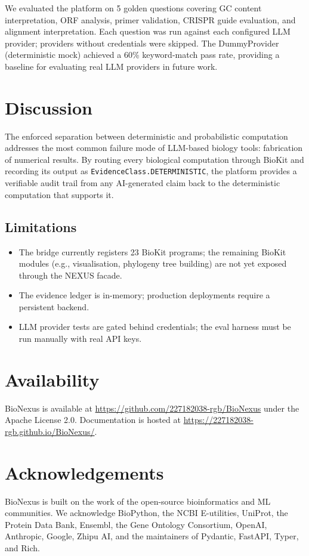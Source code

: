 \documentclass[11pt,a4paper]{article}
\begin{document}
We evaluated the platform on 5 golden questions covering GC content
interpretation, ORF analysis, primer validation, CRISPR guide evaluation,
and alignment interpretation. Each question was run against each
configured LLM provider; providers without credentials were skipped. The
DummyProvider (deterministic mock) achieved a 60\% keyword-match pass
rate, providing a baseline for evaluating real LLM providers in future
work.

\section{Discussion}

The enforced separation between deterministic and probabilistic
computation addresses the most common failure mode of LLM-based biology
tools: fabrication of numerical results. By routing every biological
computation through BioKit and recording its output as
\texttt{EvidenceClass.DETERMINISTIC}, the platform provides a verifiable
audit trail from any AI-generated claim back to the deterministic
computation that supports it.

\subsection{Limitations}

\begin{itemize}
  \item The bridge currently registers 23 BioKit programs; the remaining
        BioKit modules (e.g., visualisation, phylogeny tree building) are
        not yet exposed through the NEXUS facade.
  \item The evidence ledger is in-memory; production deployments require
        a persistent backend.
  \item LLM provider tests are gated behind credentials; the eval harness
        must be run manually with real API keys.
\end{itemize}

\section{Availability}

BioNexus is available at \url{https://github.com/227182038-rgb/BioNexus}
under the Apache License 2.0. Documentation is hosted at
\url{https://227182038-rgb.github.io/BioNexus/}.

\section{Acknowledgements}

BioNexus is built on the work of the open-source bioinformatics and ML
communities. We acknowledge BioPython, the NCBI E-utilities, UniProt, the
Protein Data Bank, Ensembl, the Gene Ontology Consortium, OpenAI,
Anthropic, Google, Zhipu AI, and the maintainers of Pydantic, FastAPI,
Typer, and Rich.
\end{document}
